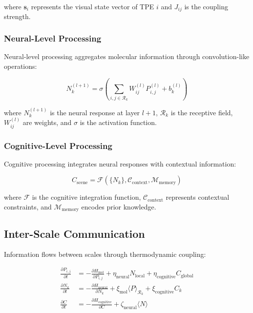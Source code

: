 \documentclass[12pt,a4paper]{article}
\begin{document}
where $\mathbf{s}_{i}$ represents the visual state vector of TPE $i$ and $J_{ij}$ is the coupling strength.

\subsubsection{Neural-Level Processing}

Neural-level processing aggregates molecular information through convolution-like operations:

\begin{equation}
N_{k}^{(l+1)} = \sigma\left(\sum_{i,j \in \mathcal{R}_k} W_{ij}^{(l)} P_{i,j}^{(l)} + b_k^{(l)}\right)
\end{equation}

where $N_k^{(l+1)}$ is the neural response at layer $l+1$, $\mathcal{R}_k$ is the receptive field, $W_{ij}^{(l)}$ are weights, and $\sigma$ is the activation function.

\subsubsection{Cognitive-Level Processing}

Cognitive processing integrates neural responses with contextual information:

\begin{equation}
C_{\text{scene}} = \mathcal{F}\left(\{N_k\}, \mathcal{C}_{\text{context}}, \mathcal{M}_{\text{memory}}\right)
\end{equation}

where $\mathcal{F}$ is the cognitive integration function, $\mathcal{C}_{\text{context}}$ represents contextual constraints, and $\mathcal{M}_{\text{memory}}$ encodes prior knowledge.

\subsection{Inter-Scale Communication}

Information flows between scales through thermodynamic coupling:

\begin{align}
\frac{\partial P_{i,j}}{\partial t} &= -\frac{\partial H_{\text{mol}}}{\partial P_{i,j}} + \eta_{\text{neural}} N_{\text{local}} + \eta_{\text{cognitive}} C_{\text{global}}\\
\frac{\partial N_k}{\partial t} &= -\frac{\partial H_{\text{neural}}}{\partial N_k} + \xi_{\text{mol}} \langle P \rangle_{\mathcal{R}_k} + \xi_{\text{cognitive}} C_k\\
\frac{\partial C}{\partial t} &= -\frac{\partial H_{\text{cognitive}}}{\partial C} + \zeta_{\text{neural}} \langle N \rangle
\end{align}
\end{document}

